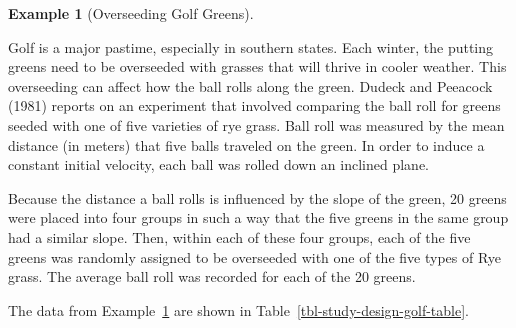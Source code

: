 \documentclass[
  letterpaper,
  DIV=11,
  numbers=noendperiod]{scrreprt}
\theoremstyle{definition}
\newtheorem{example}{Example}[chapter]
\theoremstyle{definition}
\theoremstyle{plain}
\theoremstyle{remark}
\begin{document}
\begin{example}[Overseeding Golf
Greens]\protect\hypertarget{exm-study-design-golf}{}\label{exm-study-design-golf}

Golf is a major pastime, especially in southern states. Each winter, the
putting greens need to be overseeded with grasses that will thrive in
cooler weather. This overseeding can affect how the ball rolls along the
green. Dudeck and Peeacock (1981) reports on an experiment that involved
comparing the ball roll for greens seeded with one of five varieties of
rye grass. Ball roll was measured by the mean distance (in meters) that
five balls traveled on the green. In order to induce a constant initial
velocity, each ball was rolled down an inclined plane.

Because the distance a ball rolls is influenced by the slope of the
green, 20 greens were placed into four groups in such a way that the
five greens in the same group had a similar slope. Then, within each of
these four groups, each of the five greens was randomly assigned to be
overseeded with one of the five types of Rye grass. The average ball
roll was recorded for each of the 20 greens.

\end{example}

The data from Example~\ref{exm-study-design-golf} are shown in
Table~\ref{tbl-study-design-golf-table}.
\end{document}
